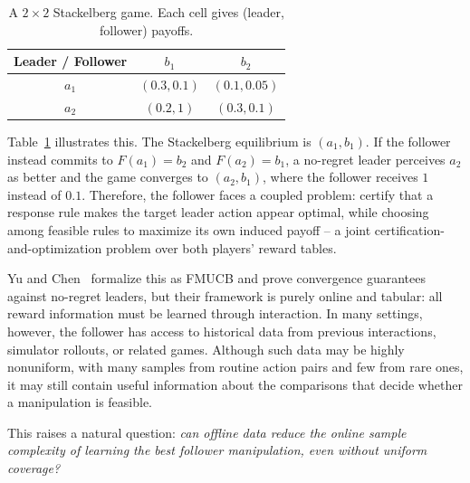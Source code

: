 \documentclass{article}
\begin{document}
\begin{table}[!ht]
\centering
\begin{tabular}{c|cc}
Leader / Follower & $b_1$ & $b_2$ \\
\hline
$a_1$ & $(0.3,0.1)$ & $(0.1,0.05)$ \\
$a_2$ & $(0.2,1)$ & $(0.3,0.1)$
\end{tabular}
\caption{A $2\times 2$ Stackelberg game. Each cell gives (leader, follower) payoffs.}
\label{tab:payoff}
\vspace{-1em}
\end{table}
Table~\ref{tab:payoff} illustrates this. The Stackelberg equilibrium is $(a_1,b_1)$. If the follower instead commits to $F(a_1)=b_2$ and $F(a_2)=b_1$, a no-regret leader perceives $a_2$ as better and the game converges to $(a_2,b_1)$, where the follower receives $1$ instead of $0.1$. Therefore, the follower faces a coupled problem: certify that a response rule makes the target leader action appear optimal, while choosing among feasible rules to maximize its own induced payoff -- a joint certification-and-optimization problem over both players' reward tables.

Yu and Chen~\cite{yu2024decentralized} formalize this as FMUCB and prove convergence guarantees against no-regret leaders, but their framework is purely online and tabular: all reward information must be learned through interaction. In many settings, however, the follower has access to historical data from previous interactions, simulator rollouts, or related games. Although such data may be highly nonuniform, with many samples from routine action pairs and few from rare ones, it may still contain useful information about the comparisons that decide whether a manipulation is feasible.

This raises a natural question: \emph{can offline data reduce the online sample complexity of learning the best follower manipulation, even without uniform coverage?}
\end{document}
